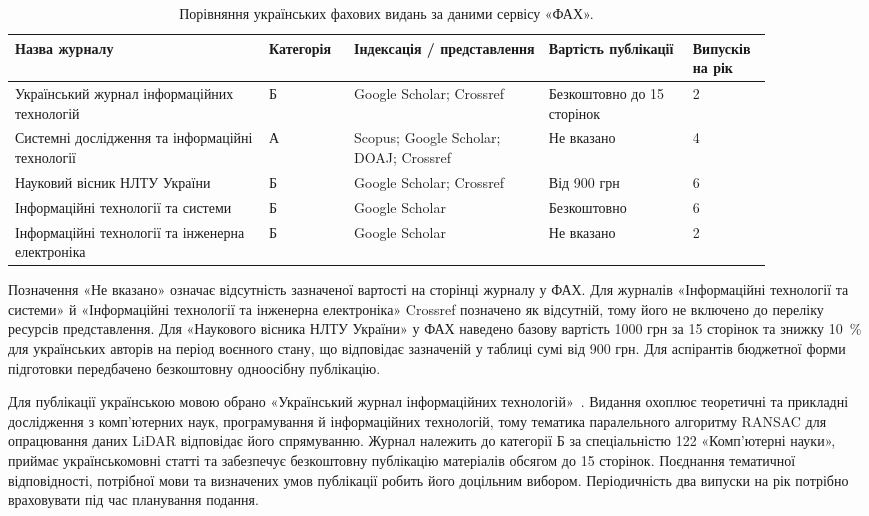 \documentclass{article}
\begin{document}
\begin{table}[H]
  \caption{Порівняння українських фахових видань за даними сервісу «ФАХ».}
  \label{tab:fakh_journals}
  \centering
  \begingroup
  \small
  \setlength{\tabcolsep}{4pt}
  \renewcommand{\arraystretch}{1.25}
  \begin{tabular}{|p{0.30\linewidth}|p{0.10\linewidth}|p{0.23\linewidth}|p{0.17\linewidth}|p{0.08\linewidth}|}
    \hline
    \textbf{Назва журналу} & \textbf{Категорія} & \textbf{Індексація / представлення} & \textbf{Вартість публікації} & \textbf{Випусків на рік} \\
    \hline
    Український журнал інформаційних технологій~\cite{fakh_ujit} & Б & Google Scholar; Crossref & Безкоштовно до 15 сторінок & 2 \\
    \hline
    Системні дослідження та інформаційні технології~\cite{fakh_srit} & А & Scopus; Google Scholar; DOAJ; Crossref & Не вказано & 4 \\
    \hline
    Науковий вісник НЛТУ України~\cite{fakh_nltu} & Б & Google Scholar; Crossref & Від 900 грн & 6 \\
    \hline
    Інформаційні технології та системи~\cite{fakh_its} & Б & Google Scholar & Безкоштовно & 6 \\
    \hline
    Інформаційні технології та інженерна електроніка~\cite{fakh_itee} & Б & Google Scholar & Не вказано & 2 \\
    \hline
  \end{tabular}
  \endgroup
\end{table}

Позначення «Не вказано» означає відсутність зазначеної вартості на сторінці журналу у ФАХ. Для журналів «Інформаційні технології та системи» й «Інформаційні технології та інженерна електроніка» Crossref позначено як відсутній, тому його не включено до переліку ресурсів представлення. Для «Наукового вісника НЛТУ України» у ФАХ наведено базову вартість 1000 грн за 15 сторінок та знижку 10~\% для українських авторів на період воєнного стану, що відповідає зазначеній у таблиці сумі від 900 грн. Для аспірантів бюджетної форми підготовки передбачено безкоштовну одноосібну публікацію.

Для публікації українською мовою обрано «Український журнал інформаційних технологій»~\cite{fakh_ujit}. Видання охоплює теоретичні та прикладні дослідження з комп'ютерних наук, програмування й інформаційних технологій, тому тематика паралельного алгоритму RANSAC для опрацювання даних LiDAR відповідає його спрямуванню. Журнал належить до категорії Б за спеціальністю 122 «Комп'ютерні науки», приймає українськомовні статті та забезпечує безкоштовну публікацію матеріалів обсягом до 15 сторінок. Поєднання тематичної відповідності, потрібної мови та визначених умов публікації робить його доцільним вибором. Періодичність два випуски на рік потрібно враховувати під час планування подання.
\end{document}
